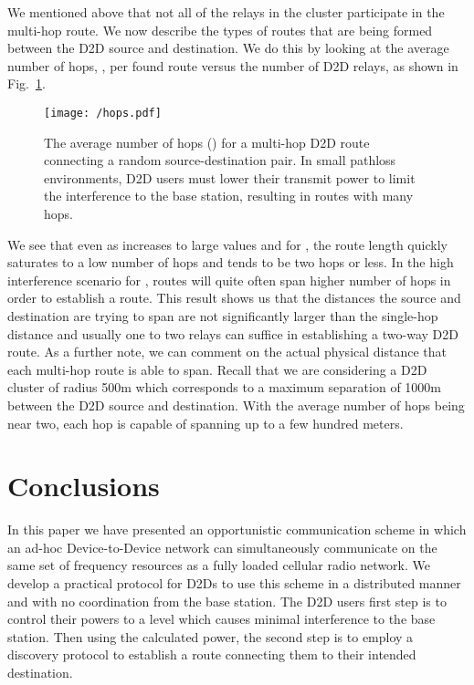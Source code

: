\documentclass[10pt, final, journal, letterpaper,oneside, twocolumn]{IEEEtran}
\begin{document}
We mentioned above that not all of the  relays in the cluster participate in the multi-hop route.  We now describe the types of routes that are being formed between the D2D source and destination.  We do this by looking at the average number of hops, , per found route versus the number of D2D relays, as shown in Fig.~\ref{fig:hops}.  
\begin{figure}[htp]
\center
 \texttt{[image: /hops.pdf]}
  \caption[labelInTOC]{The average number of hops () for a multi-hop D2D route connecting a random source-destination pair.  In small pathloss environments, D2D users must lower their transmit power to limit the interference to the base station, resulting in routes with many hops.  }
  \label{fig:hops}
\end{figure}
We see that even as  increases to large values and for , the route length quickly saturates to a low number of hops and tends to be two hops or less.  In the high interference scenario for , routes will quite often span higher number of hops in order to establish a route.  This result shows us that the distances the source and destination are trying to span are not significantly larger than the single-hop distance and usually one to two relays can suffice in establishing a two-way D2D route.  As a further note, we can comment on the actual physical distance that each multi-hop route is able to span.  Recall that we are considering a D2D cluster of radius 500m which corresponds to a maximum separation of 1000m between the D2D source and destination.  With the average number of hops being near two, each hop is capable of spanning up to a few hundred meters.





\section{Conclusions}
\label{sec:conclusion}
In this paper we have presented an opportunistic communication scheme in which an ad-hoc Device-to-Device network can simultaneously communicate on the same set of frequency resources as a fully loaded cellular radio network.  We develop a practical protocol for D2Ds to use this scheme in a distributed manner and with no coordination from the base station.  The D2D users first step is to control their powers to a level which causes minimal interference to the base station.   Then using the calculated power, the second step is to employ a discovery protocol to establish a route connecting them to their intended destination.  
\end{document}
